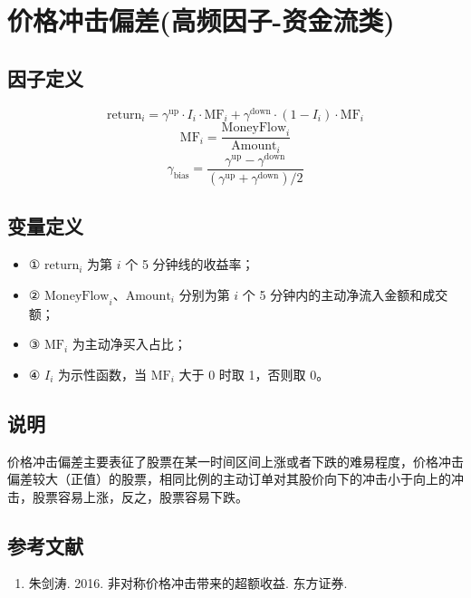 \documentclass{article}
\begin{document}
\section{价格冲击偏差(高频因子-资金流类)}

\subsection{因子定义}

\begin{equation}
    \mathrm{return}_i = \gamma^{\mathrm{up}} \cdot I_i \cdot \mathrm{MF}_i + \gamma^{\mathrm{down}} \cdot (1 - I_i) \cdot \mathrm{MF}_i
\end{equation}
\begin{equation}
    \mathrm{MF}_i = \frac{\mathrm{MoneyFlow}_i}{\mathrm{Amount}_i}
\end{equation}
\begin{equation}
    \gamma_{\mathrm{bias}} = \frac{\gamma^{\mathrm{up}} - \gamma^{\mathrm{down}}}{(\gamma^{\mathrm{up}} + \gamma^{\mathrm{down}})/2}
\end{equation}

\subsection{变量定义}
\begin{itemize}
    \item ① \( \mathrm{return}_i \) 为第 \( i \) 个 5 分钟线的收益率；
    \item ② \( \mathrm{MoneyFlow}_i \)、\( \mathrm{Amount}_i \) 分别为第 \( i \) 个 5 分钟内的主动净流入金额和成交额；
    \item ③ \( \mathrm{MF}_i \) 为主动净买入占比；
    \item ④ \( I_i \) 为示性函数，当 \( \mathrm{MF}_i \) 大于 0 时取 1，否则取 0。
\end{itemize}

\subsection{说明}
价格冲击偏差主要表征了股票在某一时间区间上涨或者下跌的难易程度，价格冲击偏差较大（正值）的股票，相同比例的主动订单对其股价向下的冲击小于向上的冲击，股票容易上涨，反之，股票容易下跌。

\subsection{参考文献}
\begin{enumerate}
    \item 朱剑涛. 2016. 非对称价格冲击带来的超额收益. 东方证券.
\end{enumerate}
\end{document}

